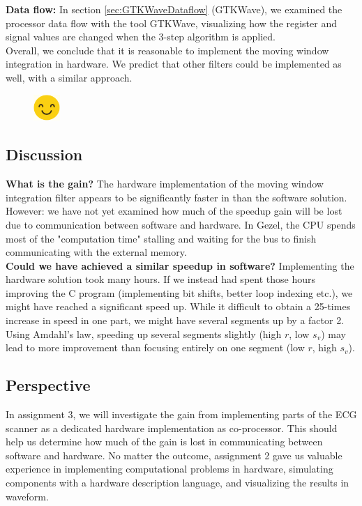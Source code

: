 \textbf{Data flow:} In section \ref{sec:GTKWaveDataflow} (GTKWave), we examined the processor data flow with the tool GTKWave, visualizing how the register and signal values are changed when the 3-step algorithm is applied.\\

Overall, we conclude that it is reasonable to implement the moving window integration in hardware. We predict that other filters could be implemented as well, with a similar approach.

\begin{figure}[H]
    \centering
    \includegraphics[height = 1cm ,width=1cm]{4Conclusion/Smiley.pdf}
\end{figure}

\subsection{Discussion}
\label{sec:discussion}
\textbf{What is the gain?} The hardware implementation of the moving window integration filter appears to be significantly faster in than the software solution. However: we have not yet examined how much of the speedup gain will be lost due to communication between software and hardware. In Gezel, the CPU spends most of the "computation time" stalling and waiting for the bus to finish communicating with the external memory. \\

\textbf{Could we have achieved a similar speedup in software?} Implementing the hardware solution took many hours. If we instead had spent those hours improving the C program (implementing bit shifts, better loop indexing etc.), we might have reached a significant speed up. While it difficult to obtain a 25-times increase in speed in one part, we might have several segments up by a factor 2. Using Amdahl's law, speeding up several segments slightly (high $r$, low $s_v$) may lead to more improvement than focusing entirely on one segment (low $r$, high $s_v$).

\subsection{Perspective}
\label{sec:perspective}
In assignment 3, we will investigate the gain from implementing parts of the ECG scanner as a dedicated hardware implementation as co-processor. This should help us determine how much of the gain is lost in communicating between software and hardware. No matter the outcome, assignment 2 gave us valuable experience in implementing computational problems in hardware, simulating components with a hardware description language, and visualizing the results in waveform.